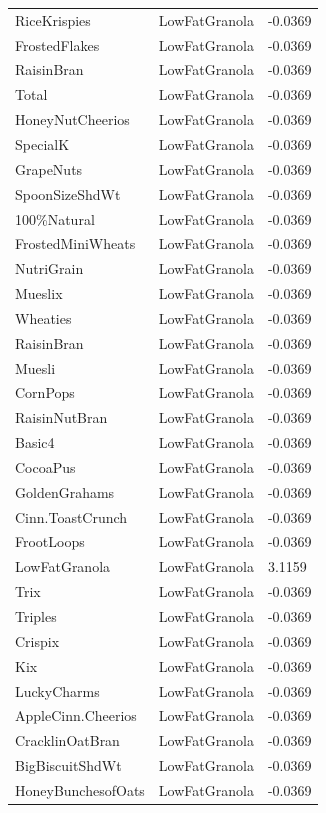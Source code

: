 \begin{table}[!htbp]
\begin{tabular}{lll}
\\
RiceKrispies & LowFatGranola & -0.0369
\\
FrostedFlakes & LowFatGranola & -0.0369
\\
RaisinBran & LowFatGranola & -0.0369
\\
Total & LowFatGranola & -0.0369
\\
HoneyNutCheerios & LowFatGranola & -0.0369
\\
SpecialK & LowFatGranola & -0.0369
\\
GrapeNuts & LowFatGranola & -0.0369
\\
SpoonSizeShdWt & LowFatGranola & -0.0369
\\
100\%Natural & LowFatGranola & -0.0369
\\
FrostedMiniWheats & LowFatGranola & -0.0369
\\
NutriGrain & LowFatGranola & -0.0369
\\
Mueslix & LowFatGranola & -0.0369
\\
Wheaties & LowFatGranola & -0.0369
\\
RaisinBran & LowFatGranola & -0.0369
\\
Muesli & LowFatGranola & -0.0369
\\
CornPops & LowFatGranola & -0.0369
\\
RaisinNutBran & LowFatGranola & -0.0369
\\
Basic4 & LowFatGranola & -0.0369
\\
CocoaPus & LowFatGranola & -0.0369
\\
GoldenGrahams & LowFatGranola & -0.0369
\\
Cinn.ToastCrunch & LowFatGranola & -0.0369
\\
FrootLoops & LowFatGranola & -0.0369
\\
LowFatGranola & LowFatGranola & 3.1159
\\
Trix & LowFatGranola & -0.0369
\\
Triples & LowFatGranola & -0.0369
\\
Crispix & LowFatGranola & -0.0369
\\
Kix & LowFatGranola & -0.0369
\\
LuckyCharms & LowFatGranola & -0.0369
\\
AppleCinn.Cheerios & LowFatGranola & -0.0369
\\
CracklinOatBran & LowFatGranola & -0.0369
\\
BigBiscuitShdWt & LowFatGranola & -0.0369
\\
HoneyBunchesofOats & LowFatGranola & -0.0369
\\

\end{tabular}
\end{table}
